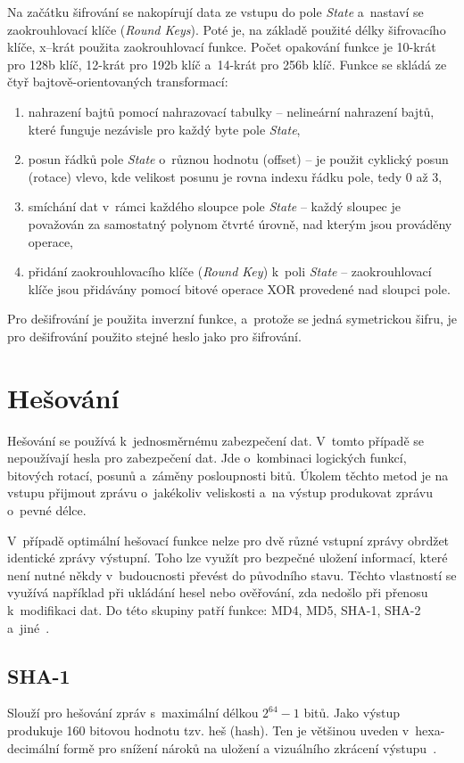Na začátku šifrování se nakopírují data ze vstupu do pole {\it State} a~nastaví se
zaokrouhlovací klíče ({\it Round Keys}). Poté je, na základě použité délky šifrovacího klíče, x--krát
použita zaokrouhlovací funkce. Počet opakování funkce je 10-krát pro 128b klíč, 12-krát pro 192b
klíč a~14-krát pro 256b klíč. Funkce se skládá ze čtyř bajtově-orientovaných transformací:
\begin{enumerate}
    \item nahrazení bajtů pomocí nahrazovací tabulky -- nelineární nahrazení bajtů, které funguje
        nezávisle pro každý byte pole {\it State},
    \item posun řádků pole {\it State} o~různou hodnotu (offset) -- je použit cyklický posun
        (rotace) vlevo, kde velikost posunu je rovna indexu řádku pole, tedy 0 až 3,
    \item smíchání dat v~rámci každého sloupce pole {\it State} -- každý sloupec je považován za
        samostatný polynom čtvrté úrovně, nad kterým jsou prováděny operace,
    \item přidání zaokrouhlovacího klíče ({\it Round Key}) k~poli {\it State} -- zaokrouhlovací
        klíče jsou přidávány pomocí bitové operace XOR provedené nad sloupci pole.
\end{enumerate}
Pro dešifrování je použita inverzní funkce, a~protože se jedná symetrickou šifru, je pro dešifrování
použito stejné heslo jako pro šifrování.

\section{Hešování}
Hešování se používá k~jednosměrnému zabezpečení dat. V~tomto případě se nepoužívají hesla pro
zabezpečení dat. Jde o~kombinaci logických funkcí, bitových rotací, posunů a~záměny posloupnosti
bitů. Úkolem těchto metod je na vstupu přijmout zprávu o~jakékoliv veliskosti a~na výstup produkovat
zprávu o~pevné délce. 

 V~případě optimální hešovací funkce nelze pro dvě různé vstupní zprávy obrdžet identické zprávy
výstupní. Toho lze využít pro bezpečné uložení informací, které není nutné někdy v~budoucnosti
převést do původního stavu. Těchto vlastností se využívá například při ukládání hesel nebo
ověřování, zda nedošlo při přenosu k~modifikaci dat. Do této skupiny patří funkce: MD4, MD5, SHA-1,
SHA-2 a~jiné~\cite{AC:1996}.

\subsection{SHA-1}
Slouží pro hešování zpráv s~maximální délkou $2^{64}-1$ bitů. Jako výstup produkuje 160 bitovou
hodnotu tzv. heš (hash). Ten je většinou uveden v~hexa-decimální formě pro snížení nároků na uložení
a vizuálního zkrácení výstupu~\cite{NIST:2015}. 

